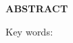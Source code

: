 \clearpage
{}
{}
\begin{center}
    \textbf{ABSTRACT}\\[0.5cm]
\end{center}

\lipsum[2-4]

\noindent Key words: \keywordsen
